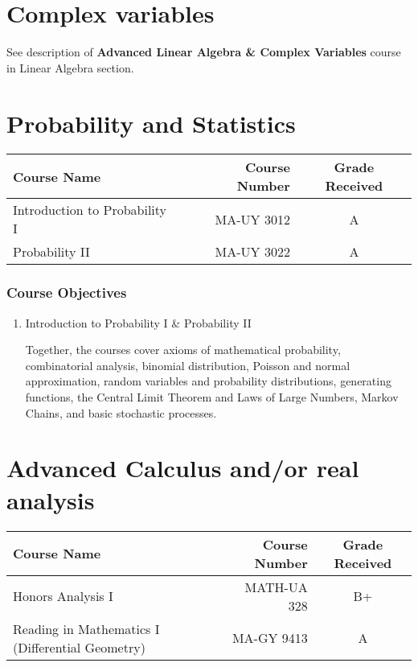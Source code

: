 \documentclass[11pt]{article}
\begin{document}
\section*{Complex variables}

See description of \textbf{Advanced Linear Algebra \& Complex Variables} course in Linear Algebra section.

\section*{Probability and Statistics}

\begin{center}
\begin{tabular}{lrc}
Course Name & Course Number & Grade Received \\ \toprule
Introduction to Probability I & MA-UY 3012 & A \\
Probability II & MA-UY 3022 & A
\end{tabular}
\end{center}

\subsubsection*{Course Objectives}
\begin{enumerate}
    \item Introduction to Probability I \& Probability II
     
    Together, the courses cover axioms of mathematical probability, combinatorial analysis, binomial distribution, Poisson and normal approximation, random variables and probability distributions, generating functions, the Central Limit Theorem and Laws of Large Numbers, Markov Chains, and basic stochastic processes.
\end{enumerate}

\section*{Advanced Calculus and/or real analysis}

\begin{center}
\begin{tabular}{lrc}
Course Name & Course Number & Grade Received \\ \toprule
Honors Analysis I & MATH-UA 328 & B+ \\
Reading in Mathematics I (Differential Geometry) & MA-GY 9413 & A
\end{tabular}
\end{center}
\end{document}

